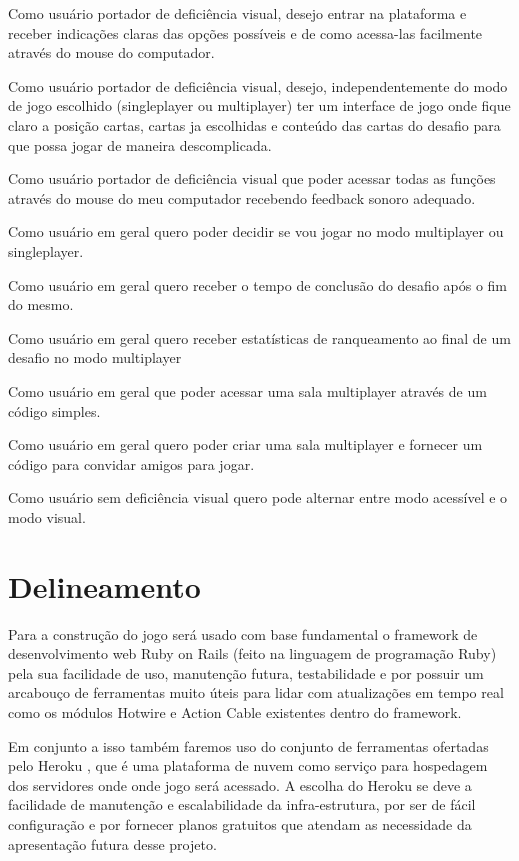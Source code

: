 \begin{alineascomnumero}
  \item Como usuário portador de deficiência visual, desejo entrar na plataforma e receber indicações claras das opções possíveis e de como acessa-las facilmente através do mouse do computador.
  \item Como usuário portador de deficiência visual, desejo, independentemente do modo de jogo escolhido (singleplayer ou multiplayer) ter um interface de jogo onde fique claro a posição cartas, cartas ja escolhidas e conteúdo das cartas do desafio para que possa jogar de maneira descomplicada.
  \item Como usuário portador de deficiência visual que poder acessar todas as funções através do mouse do meu computador recebendo feedback sonoro adequado.
  \item Como usuário em geral quero poder decidir se vou jogar no modo multiplayer ou singleplayer.
  \item Como usuário em geral quero receber o tempo de conclusão do desafio após o fim do mesmo.
  \item Como usuário em geral quero receber estatísticas de ranqueamento ao final de um desafio no modo multiplayer
  \item Como usuário em geral que poder acessar uma sala multiplayer através de um código simples.
  \item Como usuário em geral quero poder criar uma sala multiplayer e fornecer um código para convidar amigos para jogar.
  \item Como usuário sem deficiência visual quero pode alternar entre modo acessível e o modo visual.
\end{alineascomnumero}

\section{Delineamento}
Para a construção do jogo será usado com base fundamental o framework de desenvolvimento web Ruby on Rails \cite{rubyonrails} (feito na linguagem de programação Ruby) pela sua facilidade de uso, manutenção futura, testabilidade e por possuir um arcabouço de ferramentas muito úteis para lidar com atualizações em tempo real como os módulos Hotwire e Action Cable existentes dentro do framework.

Em conjunto a isso também faremos uso do conjunto de ferramentas ofertadas pelo Heroku \cite{heroku}, que é uma plataforma de nuvem como serviço para hospedagem dos servidores onde onde jogo será acessado. A escolha do Heroku se deve a facilidade de manutenção e escalabilidade da infra-estrutura, por ser de fácil configuração e por fornecer planos gratuitos que atendam as necessidade da apresentação futura desse projeto.

